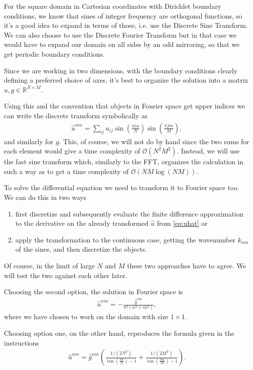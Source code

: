 \documentclass[10pt,a4paper,twocolumn]{article}
\begin{document}
For the square domain in Cartesian coordinates with Dirichlet boundary conditions, we know that sines of integer frequency are orthogonal functions, so it's a good idea to expand in terms of those, i.e. use the Discrete Sine Transform. We can also choose to use the Discrete Fourier Transform but in that case we would have to expand our domain on all sides by an odd mirroring, so that we get periodic boundary conditions.

Since we are working in two dimensions, with the boundary conditions clearly defining a preferred choice of axes, it's best to organize the solution into a matrix $u, g \in \mathbb{R}^{N \times M}$.

Using this and the convention that objects in Fourier space get upper indices we can write the discrete transform symbolically as
%
\begin{align}\label{eq:uhat}
    \hat{u}^{nm} = \sum_{ij} u_{ij} \sin \left( \frac{\pi i n}{N} \right) \sin \left( \frac{\pi j m}{M} \right),
\end{align}
%
and similarly for $g$. This, of course, we will not do by hand since the two sums for each element would give a time complexity of $\mathcal{O}(N^2 M^2)$. Instead, we will use the fast sine transform which, similarly to the FFT, organizes the calculation in such a way as to get a time complexity of $\mathcal{O}\left(N M \log(N M)\right)$.

To solve the differential equation we need to transform it to Fourier space too. We can do this in two ways
%
\begin{enumerate}
    \item first discretize and subsequently evaluate the finite difference approximation to the derivative on the already transformed $\hat{u}$ from \cref{eq:uhat} or
    \item apply the transformation to the continuous case, getting the wavenumber $k_{nm}$ of the sines, and then discretize the objects. 
\end{enumerate}
%
Of course, in the limit of large $N$ and $M$ these two approaches have to agree. We will test the two against each other later.

Choosing the second option, the solution in Fourier space is
%
\begin{align}\label{eq:cont}
    \hat{u}^{nm} = - \frac{\hat{g}^{nm}}{\pi^2 (n^2 + m^2)},
\end{align}
%
where we have chosen to work on the domain with size $1\times 1$.

Choosing option one, on the other hand, reproduces the formula given in the instructions
%
\begin{align}\label{eq:dis}
    \hat{u}^{nm} = \hat{g}^{nm} \left( \frac{1/(2N^2)}{\cos (\frac{\pi n}{N}) - 1} + \frac{1/(2M^2)}{\cos (\frac{\pi m}{M}) - 1} \right).
\end{align}
\end{document}
